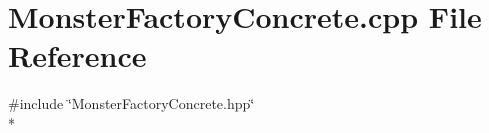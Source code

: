 \section{Monster\-Factory\-Concrete.\-cpp File Reference}
\label{_monster_factory_concrete_8cpp}
{\ttfamily \#include \char`\"{}Monster\-Factory\-Concrete.\-hpp\char`\"{}}\\*
